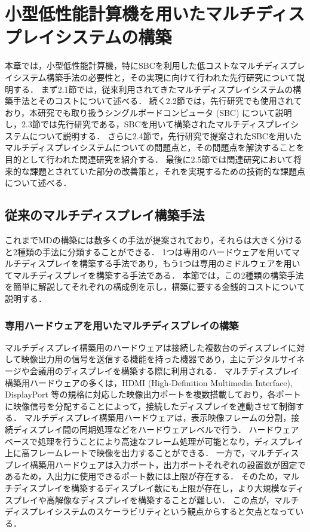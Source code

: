 \chapter{小型低性能計算機を用いたマルチディスプレイシステムの構築}

本章では，小型低性能計算機，特にSBCを利用した低コストなマルチディスプレイシステム構築手法の必要性と，その実現に向けて行われた先行研究について説明する．
まず2.1節では，従来利用されてきたマルチディスプレイシステムの構築手法とそのコストについて述べる．
続く2.2節では，先行研究でも使用されており，本研究でも取り扱うシングルボードコンピュータ (SBC) について説明し，2.3節では先行研究である，SBCを用いて構築されたマルチディスプレイシステムについて説明する．
さらに2.4節で，先行研究で提案されたSBCを用いたマルチディスプレイシステムについての問題点と，その問題点を解決することを目的として行われた関連研究を紹介する．
最後に2.5節では関連研究において将来的な課題とされていた部分の改善策と，それを実現するための技術的な課題点について述べる．

\section{従来のマルチディスプレイ構築手法}
これまでMDの構築には数多くの手法が提案されており，それらは大きく分けると2種類の手法に分類することができる\cite{pccluster,6693038}．
1つは専用のハードウェアを用いてマルチディスプレイを構築する手法であり，もう1つは専用のミドルウェアを用いてマルチディスプレイを構築する手法である．
本節では，この2種類の構築手法を簡単に解説してそれぞれの構成例を示し，構築に要する金銭的コストについて説明する．

\subsection*{専用ハードウェアを用いたマルチディスプレイの構築}

マルチディスプレイ構築用のハードウェアは接続した複数台のディスプレイに対して映像出力用の信号を送信する機能を持った機器であり，主にデジタルサイネージ\cite{signage}や会議用のディスプレイを構築する際に利用される．
マルチディスプレイ構築用ハードウェアの多くは，HDMI (High-Definition Multimedia Interface), DisplayPort \cite{displayport}等の規格に対応した映像出力ポートを複数搭載しており，各ポートに映像信号を分配することによって，接続したディスプレイを連動させて制御する．
マルチディスプレイ構築用ハードウェアは，表示映像フレームの分割，接続ディスプレイ間の同期処理などをハードウェアレベルで行う．
ハードウェアベースで処理を行うことにより高速なフレーム処理が可能となり，ディスプレイ上に高フレームレートで映像を出力することができる．
一方で，マルチディスプレイ構築用ハードウェアは入力ポート，出力ポートそれぞれの設置数が固定であるため，入出力に使用できるポート数には上限が存在する．
そのため，マルチディスプレイを構築するディスプレイ数にも上限が存在し，より大規模なディスプレイや高解像なディスプレイを構築することが難しい．
この点が，マルチディスプレイシステムのスケーラビリティという観点からすると欠点となっている．

